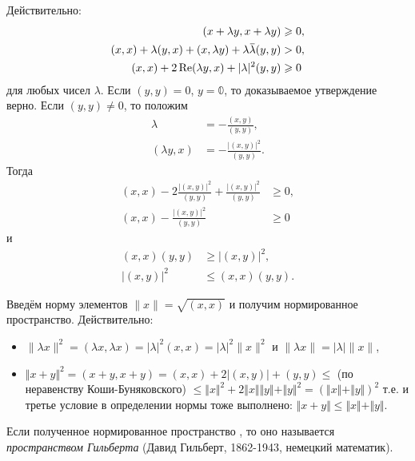 \documentclass[12pt,a4paper,titlepage,oneside]{book}
\newcommand{\overbar}[1]{\mkern 1.5mu\overline{\mkern-1.5mu#1\mkern-1.5mu}\mkern 1.5mu}
\renewcommand{\Re}{\operatorname{Re}}
\theoremstyle{definition}
\theoremstyle{plain}
\theoremstyle{break}
\theoremstyle{remark}
\theoremstyle{remark}
\theoremstyle{remark}
\theoremstyle{remark}
\theoremstyle{plain}
\theoremstyle{plain}
\begin{document}
Действительно:
\begin{align*}
(x + \lambda y, x + \lambda y) &\geqslant 0,\\
(x, x) + \lambda (y, x) + (x, \lambda y) + \lambda \overbar{\lambda} (y, y) &> 0,\\
(x,x) + 2 \Re(\lambda y, x) + \lvert \lambda \rvert^2 (y, y) &\geqslant 0\\
\end{align*}
для любых чисел $\lambda$.
Если $(y, y) = 0$, $y = \mathbb{0}$, то доказываемое утверждение верно. Если $(y, y) \neq 0$, то положим 
\begin{align*}
\lambda &= - \frac{(x, y)}{(y, y)},\\
(\lambda y, x) &= - \frac{ \lvert (x, y)\rvert^2}{(y, y)}.
\end{align*}
Тогда
\begin{align*}
(x, x) - 2 \frac{ \lvert (x, y) \rvert^2}{(y, y)} + \frac{\lvert (x, y) \rvert^2}{(y, y)} &\geqslant 0,\\
(x, x) - \frac{\lvert (x, y) \rvert^2}{(y, y)} &\geqslant 0
\end{align*}
и
\begin{align*}
(x, x) (y, y) &\geqslant \lvert (x, y) \rvert^2,\\
\lvert (x, y) \rvert^2 &\leqslant (x, x) (y, y).
\end{align*}

Введём норму элементов $\lVert x \rVert = \sqrt{(x, x)}$ и получим нормированное пространство. Действительно:

\begin{itemize}

	\item $\lVert \lambda x \rVert^2 = (\lambda x, \lambda x) = \lvert \lambda \rvert^2 (x, x) = \lvert \lambda \rvert^2 \lVert x \rVert^2$ и $\lVert \lambda x \rVert = \lvert \lambda \rvert \lVert x \rVert$,
	
	\item $\Vert x + y \Vert^2 = (x + y, x + y) = (x, x) + 2 \lvert (x, y) \rvert + (y, y) \leqslant$ (по неравенству Коши-Буняковского) $\leqslant \Vert x \Vert^2 + 2 \Vert x \Vert \Vert y \Vert + \Vert y \Vert^2 = (\Vert x \Vert + \Vert y \Vert)^2$ т.е. и третье условие в определении нормы тоже выполнено: $\Vert x + y \Vert \leqslant \Vert x \Vert + \Vert y \Vert$.

\end{itemize}

Если полученное нормированное пространство , то оно называется \textit{пространством Гильберта} (Давид Гильберт, 1862-1943, немецкий математик).
\end{document}
